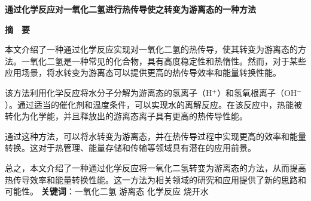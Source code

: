 \thispagestyle{empty}   %

\begin{center}
    \textbf{\fontsize{20}{1.5}通过化学反应对一氧化二氢进行热传导使之转变为游离态的一种方法}

    \textbf{摘　要}
\end{center}





%
%

本文介绍了一种通过化学反应实现对一氧化二氢的热传导，使其转变为游离态的方法。一氧化二氢是一种常见的化合物，具有高度稳定性和热惰性。然而，对于某些应用场景，将水转变为游离态可以提供更高的热传导效率和能量转换性能。

该方法利用化学反应将水分子分解为游离态的氢离子（H$^+$）和氢氧根离子（OH$^-$）。通过适当的催化剂和温度条件，可以实现水的离解反应。在该反应中，热能被转化为化学能，并且释放出的游离态离子具有更高的热传导性能。

通过这种方法，可以将水转变为游离态，并在热传导过程中实现更高的效率和能量转换。这对于热管理、能量存储和传输等领域具有潜在的应用前景。

总之，本文介绍了一种通过化学反应将一氧化二氢转变为游离态的方法，从而提高热传导效率和能量转换性能。这一方法为相关领域的研究和应用提供了新的思路和可能性。\newline
\newline
\textbf{关键词}：一氧化二氢 \quad 游离态 \quad 化学反应 \quad 烧开水
